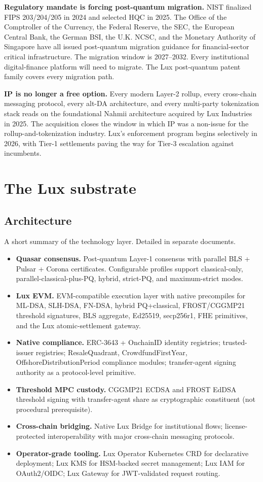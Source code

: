 \documentclass[11pt,letterpaper]{article}
\begin{document}
\textbf{Regulatory mandate is forcing post-quantum migration.} NIST finalized FIPS 203/204/205 in 2024 and selected HQC in 2025. The Office of the Comptroller of the Currency, the Federal Reserve, the SEC, the European Central Bank, the German BSI, the U.K. NCSC, and the Monetary Authority of Singapore have all issued post-quantum migration guidance for financial-sector critical infrastructure. The migration window is 2027--2032. Every institutional digital-finance platform will need to migrate. The Lux post-quantum patent family covers every migration path.

\textbf{IP is no longer a free option.} Every modern Layer-2 rollup, every cross-chain messaging protocol, every alt-DA architecture, and every multi-party tokenization stack reads on the foundational Nahmii architecture acquired by Lux Industries in 2025. The acquisition closes the window in which IP was a non-issue for the rollup-and-tokenization industry. Lux's enforcement program begins selectively in 2026, with Tier-1 settlements paving the way for Tier-3 escalation against incumbents.

\section{The Lux substrate}

\subsection{Architecture}

A short summary of the technology layer. Detailed in separate documents.

\begin{itemize}
\item \textbf{Quasar consensus.} Post-quantum Layer-1 consensus with parallel BLS + Pulsar + Corona certificates. Configurable profiles support classical-only, parallel-classical-plus-PQ, hybrid, strict-PQ, and maximum-strict modes.
\item \textbf{Lux EVM.} EVM-compatible execution layer with native precompiles for ML-DSA, SLH-DSA, FN-DSA, hybrid PQ+classical, FROST/CGGMP21 threshold signatures, BLS aggregate, Ed25519, secp256r1, FHE primitives, and the Lux atomic-settlement gateway.
\item \textbf{Native compliance.} ERC-3643 + OnchainID identity registries; trusted-issuer registries; ResaleQuadrant, CrowdfundFirstYear, OffshoreDistributionPeriod compliance modules; transfer-agent signing authority as a protocol-level primitive.
\item \textbf{Threshold MPC custody.} CGGMP21 ECDSA and FROST EdDSA threshold signing with transfer-agent share as cryptographic constituent (not procedural prerequisite).
\item \textbf{Cross-chain bridging.} Native Lux Bridge for institutional flows; license-protected interoperability with major cross-chain messaging protocols.
\item \textbf{Operator-grade tooling.} Lux Operator Kubernetes CRD for declarative deployment; Lux KMS for HSM-backed secret management; Lux IAM for OAuth2/OIDC; Lux Gateway for JWT-validated request routing.
\end{itemize}
\end{document}
